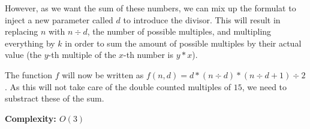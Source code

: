 \documentclass[12pt,notitlepage]{article}
\begin{document}
  However, as we want the sum of these numbers, we can mix
  up the formulat to inject a new parameter called $d$ to introduce the divisor. This will result
  in replacing $n$ with $n \div d$, the number of possible multiples, and multipling everything by $k$ in order to sum the amount of
  possible multiples by their actual value (the $y$-th multiple of the $x$-th number is $y * x$).\par

  The function $f$ will now be written as $f(n, d) = d * (n \div d) * (n \div d + 1) \div 2$. As this
  will not take care of the double counted multiples of $15$, we need to substract these of the sum.\par

  \textbf{Complexity: $O(3)$}
\end{document}
